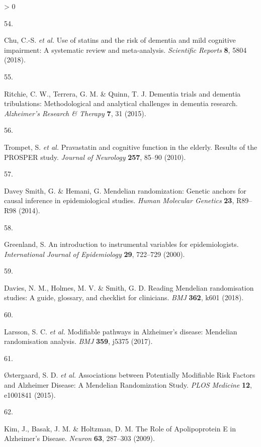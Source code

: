 \documentclass[a4paper, twoside]{templates/ociamthesis}
\newlength{\cslhangindent}
\newlength{\csllabelwidth}
\newenvironment{CSLReferences}[3] %
 {%
  \setlength{\parindent}{0pt}
  \ifodd #1 \everypar{\setlength{\hangindent}{\cslhangindent}}\ignorespaces\fi
  \ifnum #2 > 0
  \setlength{\parskip}{#2\baselineskip}
  \fi
 }%
 {}
\newcommand{\CSLLeftMargin}[1]{\parbox[t]{\maxof{\widthof{#1}}{\csllabelwidth}}{#1}}
\newcommand{\CSLRightInline}[1]{\parbox[t]{\linewidth - \csllabelwidth}{#1}}
\begin{document}
\begin{CSLReferences}{0}{0}
\leavevmode\hypertarget{ref-chu2018}{}%
\CSLLeftMargin{54. }
\CSLRightInline{Chu, C.-S. \emph{et al.} Use of statins and the risk of dementia and mild cognitive impairment: {A} systematic review and meta-analysis. \emph{Scientific Reports} \textbf{8}, 5804 (2018).}

\leavevmode\hypertarget{ref-ritchie2015}{}%
\CSLLeftMargin{55. }
\CSLRightInline{Ritchie, C. W., Terrera, G. M. \& Quinn, T. J. Dementia trials and dementia tribulations: Methodological and analytical challenges in dementia research. \emph{Alzheimer's Research \& Therapy} \textbf{7}, 31 (2015).}

\leavevmode\hypertarget{ref-trompet2010}{}%
\CSLLeftMargin{56. }
\CSLRightInline{Trompet, S. \emph{et al.} Pravastatin and cognitive function in the elderly. {Results} of the {PROSPER} study. \emph{Journal of Neurology} \textbf{257}, 85--90 (2010).}

\leavevmode\hypertarget{ref-daveysmith2014}{}%
\CSLLeftMargin{57. }
\CSLRightInline{Davey Smith, G. \& Hemani, G. Mendelian randomization: Genetic anchors for causal inference in epidemiological studies. \emph{Human Molecular Genetics} \textbf{23}, R89--R98 (2014).}

\leavevmode\hypertarget{ref-greenland2000}{}%
\CSLLeftMargin{58. }
\CSLRightInline{Greenland, S. An introduction to instrumental variables for epidemiologists. \emph{International Journal of Epidemiology} \textbf{29}, 722--729 (2000).}

\leavevmode\hypertarget{ref-davies2018}{}%
\CSLLeftMargin{59. }
\CSLRightInline{Davies, N. M., Holmes, M. V. \& Smith, G. D. Reading {Mendelian} randomisation studies: A guide, glossary, and checklist for clinicians. \emph{BMJ} \textbf{362}, k601 (2018).}

\leavevmode\hypertarget{ref-larsson2017c}{}%
\CSLLeftMargin{60. }
\CSLRightInline{Larsson, S. C. \emph{et al.} Modifiable pathways in {Alzheimer}'s disease: {Mendelian} randomisation analysis. \emph{BMJ} \textbf{359}, j5375 (2017).}

\leavevmode\hypertarget{ref-ostergaard2015}{}%
\CSLLeftMargin{61. }
\CSLRightInline{Østergaard, S. D. \emph{et al.} Associations between {Potentially Modifiable Risk Factors} and {Alzheimer Disease}: {A Mendelian Randomization Study}. \emph{PLOS Medicine} \textbf{12}, e1001841 (2015).}

\leavevmode\hypertarget{ref-kim2009}{}%
\CSLLeftMargin{62. }
\CSLRightInline{Kim, J., Basak, J. M. \& Holtzman, D. M. The {Role} of {Apolipoprotein E} in {Alzheimer}'s {Disease}. \emph{Neuron} \textbf{63}, 287--303 (2009).}


\end{CSLReferences}
\end{document}
